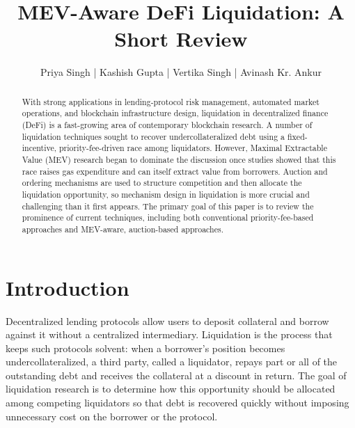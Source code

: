 \documentclass{llncs}
\begin{document}
\title{MEV-Aware DeFi Liquidation: A Short Review}

\author{Priya Singh | Kashish Gupta | Vertika Singh | Avinash Kr. Ankur}

\maketitle

\begin{abstract}
With strong applications in lending-protocol risk management, automated
market operations, and blockchain infrastructure design, liquidation in
decentralized finance (DeFi) is a fast-growing area of contemporary
blockchain research. A number of liquidation techniques sought to recover
undercollateralized debt using a fixed-incentive, priority-fee-driven
race among liquidators. However, Maximal Extractable Value (MEV)
research began to dominate the discussion once studies showed that this
race raises gas expenditure and can itself extract value from borrowers.
Auction and ordering mechanisms are used to structure competition and
then allocate the liquidation opportunity, so mechanism design in
liquidation is more crucial and challenging than it first appears. The
primary goal of this paper is to review the prominence of current
techniques, including both conventional priority-fee-based approaches
and MEV-aware, auction-based approaches.

\end{abstract}

\section{Introduction}

Decentralized lending protocols allow users to deposit collateral and
borrow against it without a centralized intermediary. Liquidation is the
process that keeps such protocols solvent: when a borrower's position
becomes undercollateralized, a third party, called a liquidator, repays
part or all of the outstanding debt and receives the collateral at a
discount in return. The goal of liquidation research is to determine how
this opportunity should be allocated among competing liquidators so that
debt is recovered quickly without imposing unnecessary cost on the
borrower or the protocol.
\end{document}
